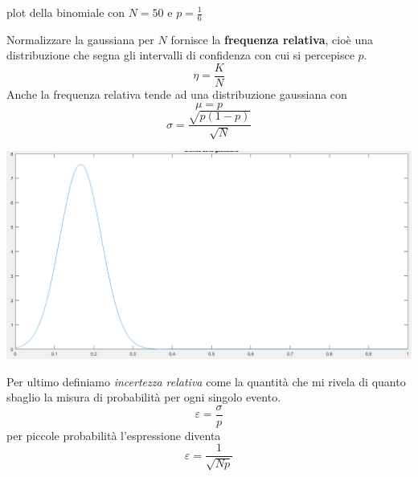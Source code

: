 \documentclass[]{article}
\begin{document}
\begin{enumerate}
\begin{center}
\begin{small}
plot della binomiale con $N=50$ e $p=\frac{1}{6}$
\end{small}
\end{center}
Normalizzare la gaussiana per $N$ fornisce la \textbf{frequenza relativa}, cioè una distribuzione che segna gli intervalli di confidenza con cui si percepisce $p$.
\begin{equation}
\eta= \frac{K}{N}
\end{equation}
Anche la frequenza relativa tende ad una distribuzione gaussiana con 
\[
\mu= p
\]
\[
\sigma= \frac{\sqrt{p(1-p)}}{\sqrt{N}}
\]
\begin{center}
\includegraphics[scale=0.2]{frequenza_relativa.png}
\end{center}
Per ultimo definiamo \textit{incertezza relativa}  come la quantità che mi rivela di quanto sbaglio la misura di probabilità per ogni singolo evento.
\begin{equation}
\varepsilon=\frac{\sigma}{p}
\end{equation}
per piccole probabilità l'espressione diventa
\[
\varepsilon= \frac{1}{\sqrt{Np}}
\]

\end{enumerate}
\end{document}
